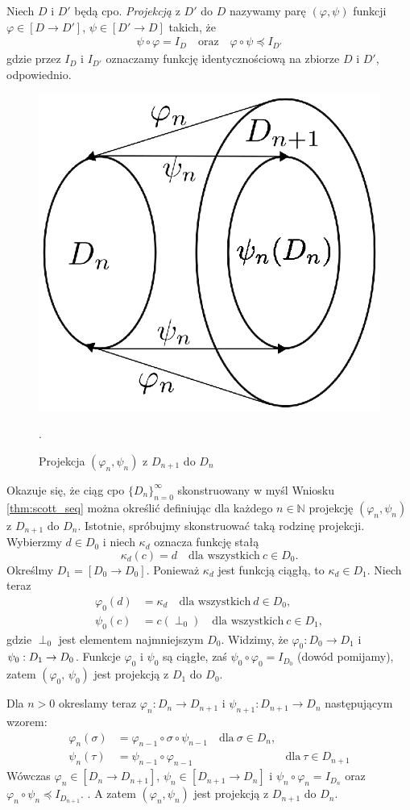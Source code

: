 \begin{definicja}[Projekcja]%
Niech \(D\) i \(D'\) będą cpo. \emph{Projekcją} z \(D'\) do \(D\) nazywamy parę \((\varphi, \psi)\) funkcji \(\varphi \in [D\to D']\), \(\psi \in [D'\to D]\) takich, że
\begin{align}
\psi\circ \varphi = I_D\quad \text{oraz}\quad \varphi\circ \psi \preceq I_{D'} %
\end{align}
gdzie przez \(I_D\) i \(I_{D'}\) oznaczamy funkcję identycznościową na zbiorze \(D\) i \(D'\), odpowiednio.
\end{definicja}

\begin{figure}[h]
  \centering
\includegraphics[width=0.32\linewidth]{../embeding_i}
  \caption{Projekcja \((\varphi_n,\psi_n)\) z \(D_{n+1}\) do \(D_n\)}.\label{fig:projection}
\end{figure}

  Okazuje się, że ciąg cpo \(\{D_n\}_{n=0}^\infty\) skonstruowany w myśl Wniosku \ref{thm:scott_seq} można określić definiując dla każdego \(n\in\mathbb{N}\) projekcję \((\varphi_n,\psi_n)\) z \(D_{n+1}\) do \(D_n\). Istotnie, spróbujmy skonstruować taką rodzinę projekcji. Wybierzmy \(d\in D_0\) i niech \(\kappa_d\) oznacza funkcję stałą 
  \[\kappa_d(c)=d\quad \text{dla wszystkich}\ c\in D_0.\]
  Określmy \(D_1=[D_0\to D_0]\). Ponieważ \(\kappa_d\) jest funkcją ciągłą, to \(\kappa_d\in D_1\). Niech teraz
  \begin{align*}
    \varphi_0 (d) &= \kappa_d  \quad \text{dla wszystkich}\ d\in D_0,\\
    \psi_0(c) &= c(\perp_0) \quad \text{dla wszystkich}\ c\in D_1,
  \end{align*}
gdzie \(\perp_0\) jest elementem najmniejszym \(D_0\). Widzimy, że \(\varphi_0: D_0 \to D_1\) i \(\psi_0:\nobreak D_1\to\nobreak D_0\). Funkcje \(\varphi_0\) i \(\psi_0\) są ciągłe, zaś \(\psi_0\circ\varphi_0 = I_{D_0}\) (dowód pomijamy), zatem \((\varphi_0,\,\psi_0)\) jest projekcją z \(D_1\) do \(D_0\).

Dla \(n>0\) okreslamy teraz \(\varphi_n : D_n \to D_{n+1}\) i \(\psi_{n+1}: D_{n+1}\to D_n\) następującym wzorem:
\begin{align*}
  \varphi_n(\sigma) &= \varphi_{n-1}\circ\sigma\circ\psi_{n-1}\quad \text{dla}\ \sigma\in D_n,\\ 
  \psi_n(\tau) &= \psi_{n-1}\circ\varphi_{n-1}\quad &\text{dla}\ \tau \in D_{n+1}
\end{align*}
Wówczas \(\varphi_n\in[D_n\to D_{n+1}]\), \(\psi_n\in[D_{n+1}\to D_n]\) i \(\psi_n\circ\varphi_n=I_{D_n}\) oraz \(\varphi_n\circ\psi_n\preceq I_{D_{n+1}}.\) \cite[Lemat 16.28]{Hindley:2008:LCI:1388400}. A zatem \((\varphi_n,\psi_n)\) jest projekcją z \(D_{n+1}\) do \(D_n\).

